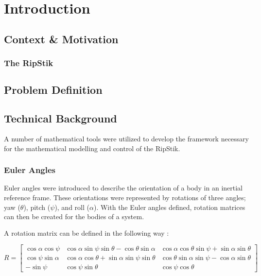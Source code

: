 \section{Introduction}
\subsection{Context \& Motivation}
\subsubsection{The RipStik}
\subsection{Problem Definition}
\subsection{Technical Background}
A number of mathematical tools were utilized to develop the framework necessary for the mathematical modelling and control of the RipStik.

\subsubsection{Euler Angles}

Euler angles were introduced to describe the orientation of a body in an inertial reference frame.
These orientations were represented by rotations of three angles; yaw ($\theta$), pitch ($\psi$), and roll ($\alpha$).
With the Euler angles defined, rotation matrices can then be created for the bodies of a system.

A rotation matrix can be defined in the following way \cite{Lewis}:

\begin{equation}
\label{eq:RotM}
R =
\begin{bmatrix} 
\cos\alpha\cos\psi & \cos\alpha\sin\psi\sin\theta - \cos\theta\sin\alpha &\cos\alpha\cos\theta\sin\psi+\sin\alpha\sin\theta\\
\cos\psi\sin\alpha & \cos\alpha\cos\theta+\sin\alpha\sin\psi\sin\theta & \cos\theta\sin\alpha\sin\psi - \cos\alpha\sin\theta\\
-\sin\psi & \cos\psi\sin\theta & \cos\psi\cos\theta 
\end{bmatrix}
\end{equation}

